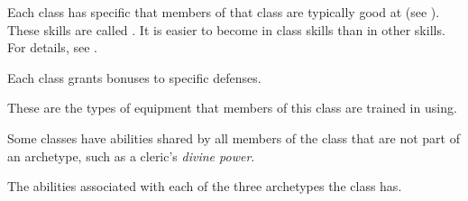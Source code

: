         Each class has specific  that members of that class are typically good at (see ).
        These skills are called .
        It is easier to become  in class skills than in other skills.
        For details, see .

        Each class grants bonuses to specific defenses.

        These are the types of equipment that members of this class are trained in using.

        Some classes have abilities shared by all members of the class that are not part of an archetype, such as a cleric's \textit{divine power}.

        The abilities associated with each of the three archetypes the class has.

\newpage
